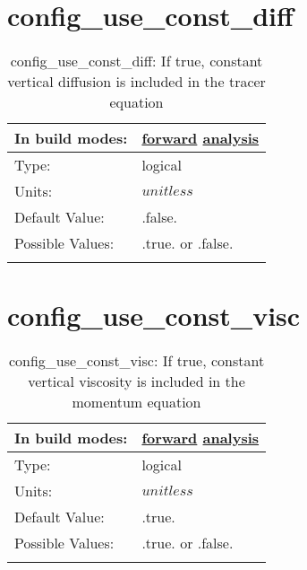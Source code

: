 \section[config\_use\_const\_diff]{config\_use\_const\_diff}
\label{sec:nm_sec_config_use_const_diff}
\begin{center}
\begin{longtable}{| p{2.0in} || p{4.0in} |}
    \hline
    In build modes: & \hyperref[subsec:forward_nm_tab_vmix_const]{forward} \hyperref[subsec:analysis_nm_tab_vmix_const]{analysis} \\
    \hline
    Type: & logical \\
    \hline
    Units: & $unitless$ \\
    \hline
    Default Value: & .false. \\
    \hline
    Possible Values: & .true. or .false. \\
    \hline
    \caption{config\_use\_const\_diff: If true, constant vertical diffusion is included in the tracer equation}
\end{longtable}
\end{center}
\section[config\_use\_const\_visc]{config\_use\_const\_visc}
\label{sec:nm_sec_config_use_const_visc}
\begin{center}
\begin{longtable}{| p{2.0in} || p{4.0in} |}
    \hline
    In build modes: & \hyperref[subsec:forward_nm_tab_vmix_const]{forward} \hyperref[subsec:analysis_nm_tab_vmix_const]{analysis} \\
    \hline
    Type: & logical \\
    \hline
    Units: & $unitless$ \\
    \hline
    Default Value: & .true. \\
    \hline
    Possible Values: & .true. or .false. \\
    \hline
    \caption{config\_use\_const\_visc: If true, constant vertical viscosity is included in the momentum equation}
\end{longtable}
\end{center}
